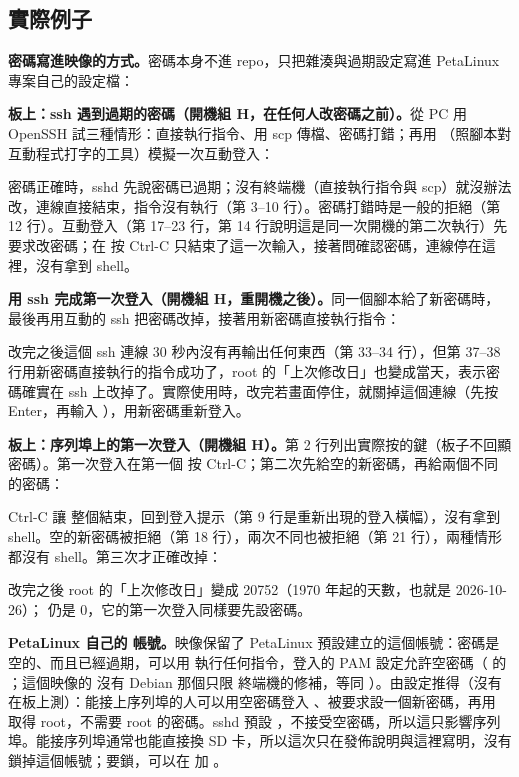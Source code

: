 \subsection{實際例子}

\textbf{密碼寫進映像的方式。}密碼本身不進 repo，只把雜湊與過期設定寫進 PetaLinux 專案自己的設定檔：


\textbf{板上：ssh 遇到過期的密碼（開機組 H，在任何人改密碼之前）。}從 PC 用 OpenSSH 試三種情形：直接執行指令、用 scp 傳檔、密碼打錯；再用 （照腳本對互動程式打字的工具）模擬一次互動登入：


密碼正確時，sshd 先說密碼已過期；沒有終端機（直接執行指令與 scp）就沒辦法改，連線直接結束，指令沒有執行（第 3--10 行）。密碼打錯時是一般的拒絕（第 12 行）。互動登入（第 17--23 行，第 14 行說明這是同一次開機的第二次執行）先要求改密碼；在  按 Ctrl-C 只結束了這一次輸入，接著問確認密碼，連線停在這裡，沒有拿到 shell。

\textbf{用 ssh 完成第一次登入（開機組 H，重開機之後）。}同一個腳本給了新密碼時，最後再用互動的 ssh 把密碼改掉，接著用新密碼直接執行指令：


改完之後這個 ssh 連線 30 秒內沒有再輸出任何東西（第 33--34 行），但第 37--38 行用新密碼直接執行的指令成功了，root 的「上次修改日」也變成當天，表示密碼確實在 ssh 上改掉了。實際使用時，改完若畫面停住，就關掉這個連線（先按 Enter，再輸入 ），用新密碼重新登入。

\textbf{板上：序列埠上的第一次登入（開機組 H）。}第 2 行列出實際按的鍵（板子不回顯密碼）。第一次登入在第一個  按 Ctrl-C；第二次先給空的新密碼，再給兩個不同的密碼：


Ctrl-C 讓  整個結束，回到登入提示（第 9 行是重新出現的登入橫幅），沒有拿到 shell。空的新密碼被拒絕（第 18 行），兩次不同也被拒絕（第 21 行），兩種情形都沒有 shell。第三次才正確改掉：


改完之後 root 的「上次修改日」變成 20752（1970 年起的天數，也就是 2026-10-26）； 仍是 0，它的第一次登入同樣要先設密碼。

\textbf{PetaLinux 自己的  帳號。}映像保留了 PetaLinux 預設建立的這個帳號：密碼是空的、而且已經過期，可以用  執行任何指令，登入的 PAM 設定允許空密碼（ 的 ；這個映像的  沒有 Debian 那個只限  終端機的修補，等同 ）。由設定推得（沒有在板上測）：能接上序列埠的人可以用空密碼登入 、被要求設一個新密碼，再用  取得 root，不需要 root 的密碼。sshd 預設 ，不接受空密碼，所以這只影響序列埠。能接序列埠通常也能直接換 SD 卡，所以這次只在發佈說明與這裡寫明，沒有鎖掉這個帳號；要鎖，可以在  加 。

